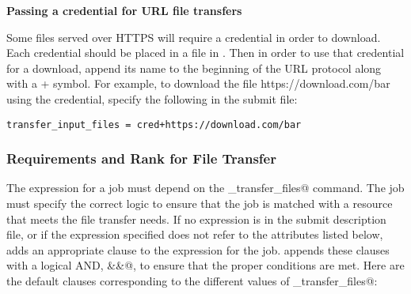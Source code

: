\textbf{Passing a credential for URL file transfers}

Some files served over HTTPS will require a credential in order to download.
Each credential  should be placed in a file in 
. Then in order to use that credential for 
a download, append its name to the beginning of the URL protocol along with a + 
symbol. For example, to download the file 
https://download.com/bar using the  credential, specify the 
following in the submit file:
\footnotesize
\begin{verbatim}
transfer_input_files = cred+https://download.com/bar
\end{verbatim}
\normalsize

\subsubsection{Requirements and Rank for File Transfer}

The  expression for a job must depend
on the \verb@should_transfer_files@ command.
The job must specify the correct logic to ensure that the job is matched
with a resource that meets the file transfer needs.
If no  expression is in the submit description file,
or if the expression specified does not refer to the
attributes listed below,  adds an
appropriate clause to the  expression for the job.
 appends these clauses with a logical AND, \verb@&&@,
to ensure that the proper conditions are met.
Here are the default clauses corresponding to the different values of
\verb@should_transfer_files@:

